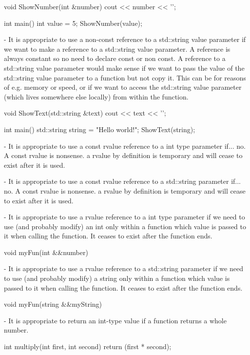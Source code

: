 \documentclass{article}[10pt]
\begin{document}
\begin{cpp}
void ShowNumber(int &number)
{
    cout << number << '\n';
}

int main()
{
    int value = 5;
    ShowNumber(value);
}
\end{cpp}

- It is appropriate to use a non-const reference to a std::string value parameter if we want to make a reference to a std::string value parameter. A reference is always constant so no need to declare const or non const.
A reference to a std::string value parameter would make sense if we want to pass the value of the std::string value parameter to a function but not copy it. This can be for reasons of e.g. memory or speed, or if we want to access the std::string value parameter (which lives somewhere else locally) from within the function.

\begin{cpp}
void ShowText(std::string &text)
{
    cout << text << '\n';
}

int main()
{
    std::string string = "Hello world!";
    ShowText(string);
}
\end{cpp}

- It is appropriate to use a const rvalue reference to a int type parameter if... no. A const rvalue is nonsense. a rvalue by definition is temporary and will cease to exist after it is used. 


- It is appropriate to use a const rvalue reference to a std::string parameter if... no. A const rvalue is nonsense. a rvalue by definition is temporary and will cease to exist after it is used. 


- It is appropriate to use a rvalue reference to a int type parameter if we need to use (and probably modify) an int only within a function which value is passed to it when calling the function. It ceases to exist after the function ends.
\begin{cpp}
void myFun(int &&number)
\end{cpp}

- It is appropriate to use a rvalue reference to a std::string parameter if we need to use (and probably modify) a string only within a function which value is passed to it when calling the function. It ceases to exist after the function ends.

\begin{cpp}
void myFun(string &&myString)
\end{cpp}

- It is appropriate to return an int-type value if a function returns a whole number.
\begin{cpp}
int multiply(int first, int second)
{
    return (first * second);
}
\end{cpp}
\end{document}
